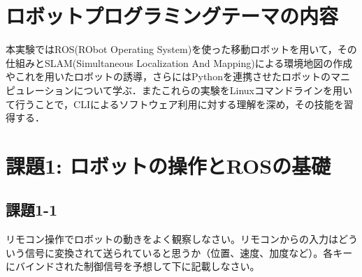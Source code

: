 \documentclass[12pt, xelatex,ja=standard,jafont=hiragino]{bxjsarticle}
\date{\today}
\date{\today}
\newif\ifdraft
\begin{document}
\maketitle
\section{ロボットプログラミングテーマの内容}
\ifdraft
（この文章は58行目の\verb|\drafttrue|をコメントアウトすると消える）

ここにロボットプログラミングのテーマ内容について、自分なりにまとめて200字程度で説明を記載すること。どういう実験内容か、何を学ぶか、など。 以下の各実験課題の結果についても、データや画像、プログラムコードを貼り付けるだけでなく、それぞれの説明をレポートとして記載すること。
それらがどの程度充実しているかが評価につながる。

キャプチャ画像の解像度が高すぎるとファイルのサイズが20MBを超えてしまいmanaba+Rにアップロードできなくなる。解像度を下げることと（低すぎて見づらくならないように）PNG画像よりもJPG画像を用いるほうがよい。

\fi
本実験ではROS(RObot Operating System)を使った移動ロボットを用いて，その仕組みとSLAM(Simultaneous Localization And Mapping)による環境地図の作成やこれを用いたロボットの誘導，さらにはPythonを連携させたロボットのマニピュレーションについて学ぶ．またこれらの実験をLinuxコマンドラインを用いて行うことで，CLIによるソフトウェア利用に対する理解を深め，その技能を習得する．

\section{課題1: ロボットの操作とROSの基礎}

\subsection{課題1-1}
\begin{screen}
リモコン操作でロボットの動きをよく観察しなさい。リモコンからの入力はどういう信号に変換されて送られていると思うか（位置、速度、加度など）。各キーにバインドされた制御信号を予想して下に記載しなさい。
\end{screen}
\end{document}
